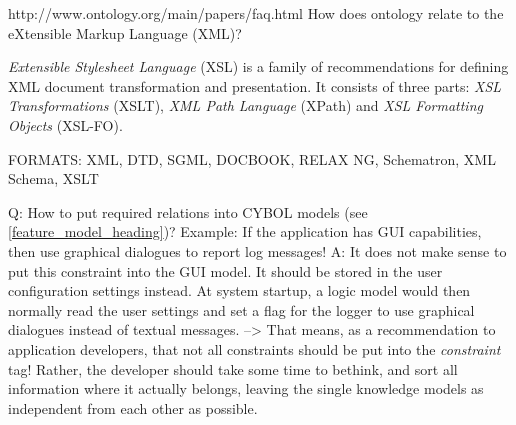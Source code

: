http://www.ontology.org/main/papers/faq.html
How does ontology relate to the eXtensible Markup Language (XML)?

\emph{Extensible Stylesheet Language} (XSL) is a family of recommendations for
defining XML document transformation and presentation. It consists of three parts:
\emph{XSL Transformations} (XSLT), \emph{XML Path Language} (XPath) and
\emph{XSL Formatting Objects} (XSL-FO).


FORMATS: XML, DTD, SGML, DOCBOOK, RELAX NG, Schematron, XML Schema, XSLT

Q: How to put required relations into CYBOL models (see \ref{feature_model_heading})?
Example: If the application has GUI capabilities, then use graphical dialogues
to report log messages!
A: It does not make sense to put this constraint into the GUI model.
It should be stored in the user configuration settings instead.
At system startup, a logic model would then normally read the user settings
and set a flag for the logger to use graphical dialogues instead of textual messages.
--> That means, as a recommendation to application developers, that not all
constraints should be put into the \emph{constraint} tag! Rather, the developer
should take some time to bethink, and sort all information where it actually belongs,
leaving the single knowledge models as independent from each other as possible.
